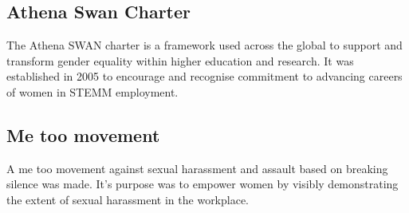 \documentclass[a4paper]{article}
\theoremstyle{plain}
\theoremstyle{definition}
\theoremstyle{remark}
\begin{document}
\subsection{Athena Swan Charter}
The Athena SWAN charter is a framework used across the global to support and transform gender equality within higher education and research. It was established in 2005 to encourage and recognise commitment to advancing careers of women in STEMM employment.
\subsection{Me too movement}
A me too movement against sexual harassment and assault based on breaking silence was made. It's purpose was to empower women by visibly demonstrating the extent of sexual harassment in the workplace.
\end{document}
